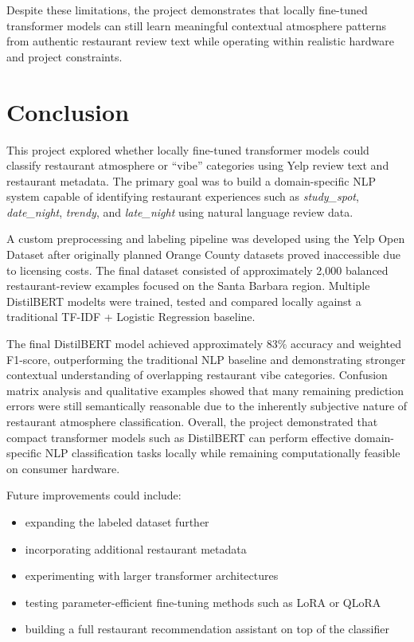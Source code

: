 \documentclass[11pt]{article}
\begin{document}
\medbreak \noindent Despite these limitations, the project demonstrates that locally fine-tuned transformer models can still learn meaningful contextual atmosphere patterns 
from authentic restaurant review text while operating within realistic hardware and project constraints.


\section{Conclusion}

This project explored whether locally fine-tuned transformer models could classify restaurant atmosphere or ``vibe'' categories using Yelp review text and restaurant metadata. 
The primary goal was to build a domain-specific NLP system capable of identifying restaurant experiences such as \textit{study\_spot}, \textit{date\_night}, \textit{trendy}, and 
\textit{late\_night} using natural language review data.

\medbreak \noindent A custom preprocessing and labeling pipeline was developed using the Yelp Open Dataset after originally planned Orange County datasets proved inaccessible due to licensing costs. 
The final dataset consisted of approximately 2,000 balanced restaurant-review examples focused on the Santa Barbara region. Multiple DistilBERT modelts were trained, tested and 
compared locally against a traditional TF-IDF + Logistic Regression baseline.

\medbreak \noindent The final DistilBERT model achieved approximately 83\% accuracy and weighted F1-score, outperforming the traditional NLP baseline and demonstrating stronger 
contextual understanding of overlapping restaurant vibe categories. Confusion matrix analysis and qualitative examples showed that many remaining prediction errors were still 
semantically reasonable due to the inherently subjective nature of restaurant atmosphere classification. Overall, the project demonstrated that compact transformer models such as DistilBERT can 
perform effective domain-specific NLP classification tasks locally while remaining computationally feasible on consumer hardware.

\medbreak \noindent Future improvements could include:
\begin{itemize}[nosep]
    \item expanding the labeled dataset further
    \item incorporating additional restaurant metadata
    \item experimenting with larger transformer architectures
    \item testing parameter-efficient fine-tuning methods such as LoRA or QLoRA
    \item building a full restaurant recommendation assistant on top of the classifier
\end{itemize}
\end{document}
